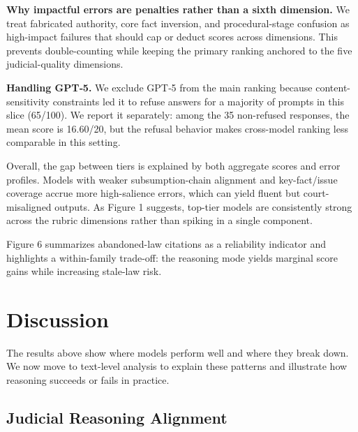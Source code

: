 {{{{{{{{{{{\textbf{Why impactful errors are penalties rather than a sixth dimension.} We treat fabricated authority, core fact inversion, and procedural-stage confusion as high-impact failures that should cap or deduct scores across dimensions. This prevents double-counting while keeping the primary ranking anchored to the five judicial-quality dimensions.

\textbf{Handling GPT‑5.} We exclude GPT‑5 from the main ranking because content-sensitivity constraints led it to refuse answers for a majority of prompts in this slice (65/100). We report it separately: among the 35 non-refused responses, the mean score is 16.60/20, but the refusal behavior makes cross-model ranking less comparable in this setting.

Overall, the gap between tiers is explained by both aggregate scores and error profiles. Models with weaker subsumption-chain alignment and key-fact/issue coverage accrue more high-salience errors, which can yield fluent but court-misaligned outputs. As Figure 1 suggests, top-tier models are consistently strong across the rubric dimensions rather than spiking in a single component.

Figure 6 summarizes abandoned-law citations as a reliability indicator and highlights a within-family trade-off: the reasoning mode yields marginal score gains while increasing stale-law risk.

\hypertarget{discussion}{%
\section{Discussion}\label{discussion}

The results above show where models perform well and where they break down.\\
We now move to text-level analysis to explain these patterns and illustrate how reasoning succeeds or fails in practice.

\hypertarget{judicial-reasoning-alignment}{%
\subsection{Judicial Reasoning Alignment}\label{judicial-reasoning-alignment}

}}}}}}}}}}}}}
